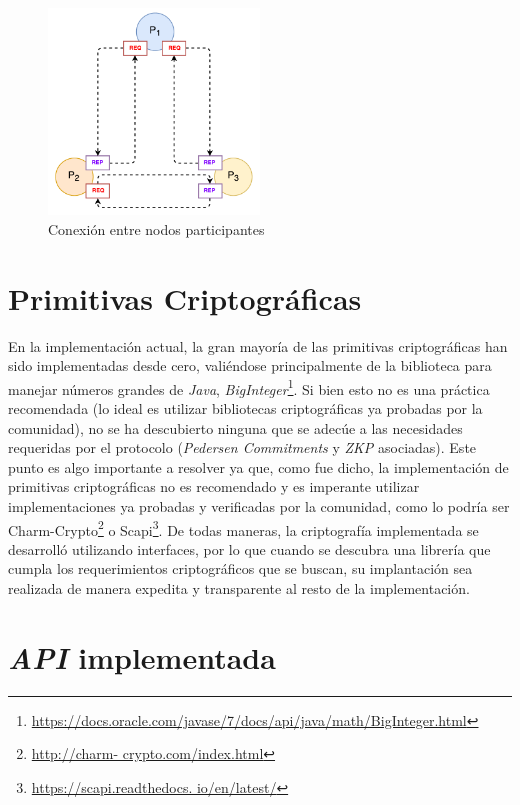 {\begin{figure}[H]
  \centering
    \includegraphics[width=0.5\textwidth]{imagenes/participants_connection.pdf}
  \caption{Conexión entre nodos participantes}
  \label{fig:connections-participants}
\end{figure}

\section{Primitivas Criptográficas}

En la implementación actual, la gran mayoría de las primitivas criptográficas 
han sido implementadas desde cero, valiéndose principalmente de la biblioteca 
para manejar números grandes de \emph{Java}, \emph{BigInteger}\footnote{\url{
https://docs.oracle.com/javase/7/docs/api/java/math/BigInteger.html}}. Si bien 
esto no es una práctica recomendada (lo ideal es utilizar bibliotecas 
criptográficas ya probadas por la comunidad), no se ha descubierto ninguna que 
se adecúe a las necesidades requeridas por el protocolo (\emph{Pedersen 
Commitments} y \emph{ZKP} asociadas). Este punto es algo importante a resolver 
ya que, como fue dicho, la implementación de primitivas criptográficas no es 
recomendado y es imperante utilizar implementaciones ya probadas y verificadas 
por la comunidad, como lo podría ser Charm-Crypto\footnote{\url{http://charm-
crypto.com/index.html}} o Scapi\footnote{\url{https://scapi.readthedocs.
io/en/latest/}}. De todas maneras, la criptografía implementada se desarrolló 
utilizando interfaces, por lo que cuando se descubra una librería que cumpla 
los requerimientos criptográficos que se buscan, su implantación sea realizada 
de manera expedita y transparente al resto de la implementación.

\section{\emph{API} implementada}

}
